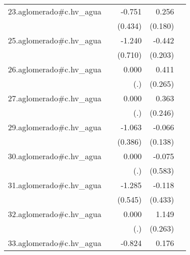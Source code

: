 {\begin{longtable}{l*{4}{D{.}{.}{-1}}}
\addlinespace
23.aglomerado#c.hv\_agua&                     &      -0.751         &       0.256         &                     \\
            &                     &     (0.434)         &     (0.180)         &                     \\
\addlinespace
25.aglomerado#c.hv\_agua&                     &      -1.240         &      -0.442\sym{*}  &                     \\
            &                     &     (0.710)         &     (0.203)         &                     \\
\addlinespace
26.aglomerado#c.hv\_agua&                     &       0.000         &       0.411         &                     \\
            &                     &         (.)         &     (0.265)         &                     \\
\addlinespace
27.aglomerado#c.hv\_agua&                     &       0.000         &       0.363         &                     \\
            &                     &         (.)         &     (0.246)         &                     \\
\addlinespace
29.aglomerado#c.hv\_agua&                     &      -1.063\sym{**} &      -0.066         &                     \\
            &                     &     (0.386)         &     (0.138)         &                     \\
\addlinespace
30.aglomerado#c.hv\_agua&                     &       0.000         &      -0.075         &                     \\
            &                     &         (.)         &     (0.583)         &                     \\
\addlinespace
31.aglomerado#c.hv\_agua&                     &      -1.285\sym{*}  &      -0.118         &                     \\
            &                     &     (0.545)         &     (0.433)         &                     \\
\addlinespace
32.aglomerado#c.hv\_agua&                     &       0.000         &       1.149\sym{***}&                     \\
            &                     &         (.)         &     (0.263)         &                     \\
\addlinespace
33.aglomerado#c.hv\_agua&                     &      -0.824\sym{*}  &       0.176\sym{*}  &                     \\

\end{longtable}}
